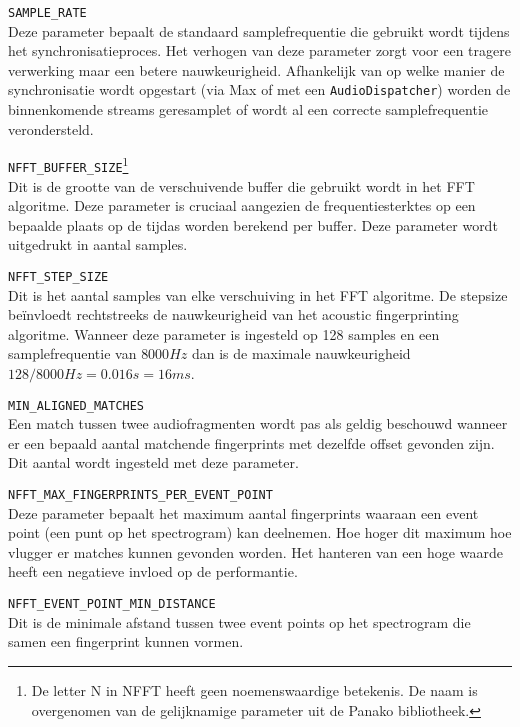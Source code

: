 \begin{description}
\item\texttt{SAMPLE\_RATE} \hfill \\
Deze parameter bepaalt de standaard samplefrequentie die gebruikt wordt tijdens het synchronisatieproces. Het verhogen van deze parameter zorgt voor een tragere verwerking maar een betere nauwkeurigheid. Afhankelijk van op welke manier de synchronisatie wordt opgestart (via Max of met een \texttt{AudioDispatcher}) worden de binnenkomende streams geresamplet of wordt al een correcte samplefrequentie verondersteld.

\item\texttt{NFFT\_BUFFER\_SIZE}\footnote{De letter N in NFFT heeft geen noemenswaardige betekenis. De naam is overgenomen van de gelijknamige parameter uit de Panako bibliotheek.} \hfill \\
Dit is de grootte van de verschuivende buffer die gebruikt wordt in het FFT algoritme. Deze parameter is cruciaal aangezien de frequentiesterktes op een bepaalde plaats op de tijd\-as worden berekend per buffer. Deze parameter wordt uitgedrukt in aantal samples.
\item\texttt{NFFT\_STEP\_SIZE} \hfill \\
Dit is het aantal samples van elke verschuiving in het FFT algoritme. De stepsize beïnvloedt rechtstreeks de nauwkeurigheid van het acoustic fingerprinting algoritme. Wanneer deze parameter is ingesteld op 128 samples en een samplefrequentie van $8000Hz$ dan is de maximale nauwkeurigheid $128/8000Hz = 0.016s = 16ms$.
\item\texttt{MIN\_ALIGNED\_MATCHES} \hfill \\
Een match tussen twee audiofragmenten wordt pas als geldig beschouwd wanneer er een bepaald aantal matchende fingerprints met dezelfde offset gevonden zijn. Dit aantal wordt ingesteld met deze parameter.
\item\texttt{NFFT\_MAX\_FINGERPRINTS\_PER\_EVENT\_POINT} \hfill \\
Deze parameter bepaalt het maximum aantal fingerprints waaraan een event point (een punt op het spectrogram) kan deelnemen. Hoe hoger dit maximum hoe vlugger er matches kunnen gevonden worden. Het hanteren van een hoge waarde heeft een negatieve invloed op de performantie.
\item\texttt{NFFT\_EVENT\_POINT\_MIN\_DISTANCE} \hfill \\
Dit is de minimale afstand tussen twee event points op het spectrogram die samen een fingerprint kunnen vormen. 

\end{description}

